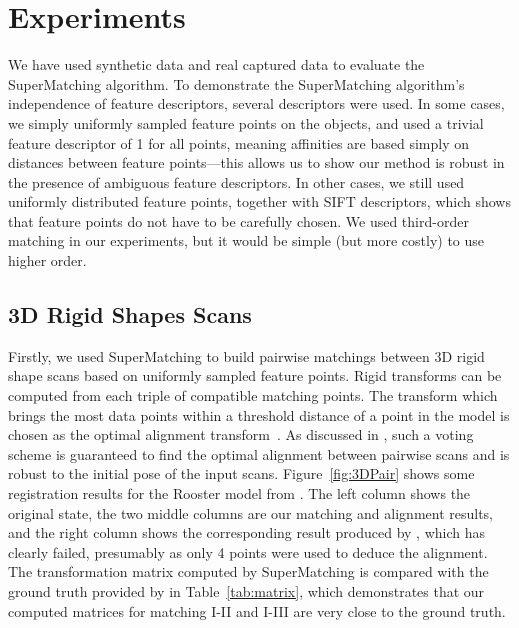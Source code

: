 \section{Experiments}
\label{sec:experiments}

We have used synthetic data and real captured data to evaluate the SuperMatching algorithm.
To demonstrate  the SuperMatching algorithm's independence of feature descriptors, several descriptors were used.
In some cases, we simply uniformly sampled feature points on the objects, and used a trivial feature descriptor of 1 for all points, meaning affinities are based simply on distances between feature points---this allows us to show our method is robust in the presence of ambiguous feature descriptors.
In other cases, we still used uniformly distributed feature points, together with SIFT descriptors, which shows that feature points do not have to be carefully chosen.
We used third-order matching in our experiments, but it would be simple (but more costly) to use higher order.

\subsection{3D Rigid Shapes Scans}
\label{subsec:3DRigid}

Firstly, we used SuperMatching to build pairwise matchings between 3D rigid shape scans based on uniformly sampled feature points.
Rigid transforms can be computed from each triple of compatible matching points.
The transform which brings the most data points within a threshold distance of a point in the model is chosen as the optimal alignment transform~\cite{Huttenlocher90}.
As discussed in \cite{Gelfand05}, such a voting scheme is guaranteed to find the optimal alignment between pairwise scans and is robust to the initial pose of the input scans.
Figure~\ref{fig:3DPair} shows some registration results for the Rooster model from \cite{Chuang09}. The left column shows the original state,
the two middle columns are our matching and alignment results, and
the right column shows the corresponding result produced by \cite{Aiger08}, which has clearly failed, presumably as only 4 points were used to deduce the alignment.
The transformation matrix computed by  SuperMatching is compared with the ground truth provided by \cite{Chuang09} in Table~\ref{tab:matrix}, which demonstrates that our computed matrices for matching I-II and I-III are very close to the ground truth. 

